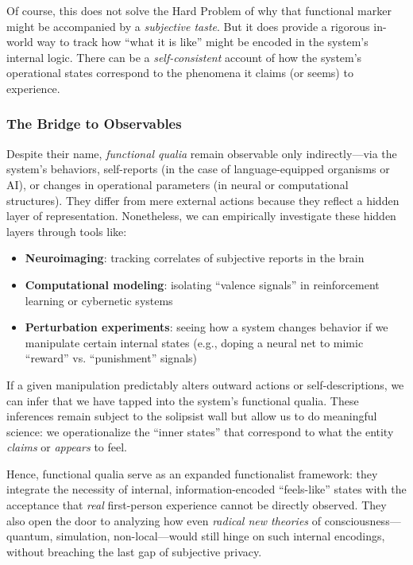 \documentclass[12pt]{article}
\begin{document}
Of course, this does not solve the Hard Problem of why that functional marker might be accompanied by a \textit{subjective taste}. But it does provide a rigorous in-world way to track how ``what it is like'' might be encoded in the system's internal logic. There can be a \textit{self-consistent} account of how the system's operational states correspond to the phenomena it claims (or seems) to experience.

\subsubsection{The Bridge to Observables}

Despite their name, \textit{functional qualia} remain observable only indirectly---via the system's behaviors, self-reports (in the case of language-equipped organisms or AI), or changes in operational parameters (in neural or computational structures). They differ from mere external actions because they reflect a hidden layer of representation. Nonetheless, we can empirically investigate these hidden layers through tools like:

\begin{itemize}
    \item \textbf{Neuroimaging}: tracking correlates of subjective reports in the brain
    \item \textbf{Computational modeling}: isolating ``valence signals'' in reinforcement learning or cybernetic systems
    \item \textbf{Perturbation experiments}: seeing how a system changes behavior if we manipulate certain internal states (e.g., doping a neural net to mimic ``reward'' vs. ``punishment'' signals)
\end{itemize}

If a given manipulation predictably alters outward actions or self-descriptions, we can infer that we have tapped into the system's functional qualia. These inferences remain subject to the solipsist wall but allow us to do meaningful science: we operationalize the ``inner states'' that correspond to what the entity \textit{claims} or \textit{appears} to feel.

Hence, functional qualia serve as an expanded functionalist framework: they integrate the necessity of internal, information-encoded ``feels-like'' states with the acceptance that \textit{real} first-person experience cannot be directly observed. They also open the door to analyzing how even \textit{radical new theories} of consciousness---quantum, simulation, non-local---would still hinge on such internal encodings, without breaching the last gap of subjective privacy.
\end{document}
